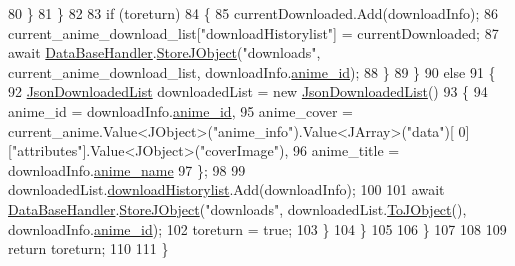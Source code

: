 \begin{DoxyCode}
80                             \}
81                         \}
82 
83                         \textcolor{keywordflow}{if} (toreturn)
84                         \{
85                             currentDownloaded.Add(downloadInfo);
86                             current\_anime\_download\_list[\textcolor{stringliteral}{"downloadHistorylist"}] = currentDownloaded;
87                             await \mbox{\hyperlink{class_little_weeb_library_1_1_handlers_1_1_file_history_handler_afe186c8ea770ecb9253a07f82f23c471}{DataBaseHandler}}.\mbox{\hyperlink{interface_little_weeb_library_1_1_handlers_1_1_i_data_base_handler_a5d87c42ef7dc7e5d86f7e6fada3454e9}{StoreJObject}}(\textcolor{stringliteral}{"downloads"}, 
      current\_anime\_download\_list, downloadInfo.\mbox{\hyperlink{class_little_weeb_library_1_1_models_1_1_json_downloaded_info_a400a0cb7bf87a5c5a03c099ebd95fc07}{anime\_id}});
88                         \}
89                     \}
90                     \textcolor{keywordflow}{else}
91                     \{
92                         \mbox{\hyperlink{class_little_weeb_library_1_1_models_1_1_json_downloaded_list}{JsonDownloadedList}} downloadedList = \textcolor{keyword}{new} 
      \mbox{\hyperlink{class_little_weeb_library_1_1_models_1_1_json_downloaded_list}{JsonDownloadedList}}()
93                         \{
94                             anime\_id = downloadInfo.\mbox{\hyperlink{class_little_weeb_library_1_1_models_1_1_json_downloaded_info_a400a0cb7bf87a5c5a03c099ebd95fc07}{anime\_id}},
95                             anime\_cover = current\_anime.Value<JObject>(\textcolor{stringliteral}{"anime\_info"}).Value<JArray>(\textcolor{stringliteral}{"data"})[
      0][\textcolor{stringliteral}{"attributes"}].Value<JObject>(\textcolor{stringliteral}{"coverImage"}),
96                             anime\_title = downloadInfo.\mbox{\hyperlink{class_little_weeb_library_1_1_models_1_1_json_downloaded_info_a48cda1035291586df653b956a5075a24}{anime\_name}}
97                         \};
98 
99                         downloadedList.\mbox{\hyperlink{class_little_weeb_library_1_1_models_1_1_json_downloaded_list_a703b2878786376f7a1ad264118a70d75}{downloadHistorylist}}.Add(downloadInfo);
100 
101                         await \mbox{\hyperlink{class_little_weeb_library_1_1_handlers_1_1_file_history_handler_afe186c8ea770ecb9253a07f82f23c471}{DataBaseHandler}}.\mbox{\hyperlink{interface_little_weeb_library_1_1_handlers_1_1_i_data_base_handler_a5d87c42ef7dc7e5d86f7e6fada3454e9}{StoreJObject}}(\textcolor{stringliteral}{"downloads"}, 
      downloadedList.\mbox{\hyperlink{class_little_weeb_library_1_1_models_1_1_json_downloaded_list_a97de2493e2a60e3d98bd480c311a08b9}{ToJObject}}(), downloadInfo.\mbox{\hyperlink{class_little_weeb_library_1_1_models_1_1_json_downloaded_info_a400a0cb7bf87a5c5a03c099ebd95fc07}{anime\_id}});
102                         toreturn = \textcolor{keyword}{true};
103                     \}
104                 \}
105               
106             \}
107                     
108 
109             \textcolor{keywordflow}{return} toreturn;
110            
111         \}
\end{DoxyCode}
